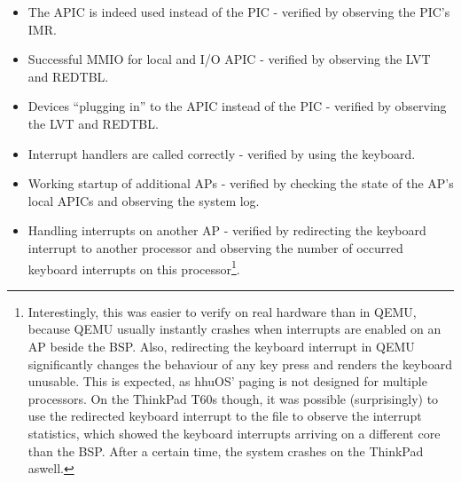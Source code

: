 \begin{itemize}
  \item The APIC is indeed used instead of the PIC - verified by observing the PIC's IMR\@.
  \item Successful MMIO for local and I/O APIC - verified by observing the LVT and REDTBL\@.
  \item Devices ``plugging in'' to the APIC instead of the PIC - verified by observing the LVT and
        REDTBL\@.
  \item Interrupt handlers are called correctly - verified by using the keyboard.
  \item Working startup of additional APs - verified by checking the state of the AP's local APICs and
        observing the system log.
  \item Handling interrupts on another AP - verified by redirecting the keyboard interrupt to another
        processor and observing the number of occurred keyboard interrupts on this
        processor\footnote{Interestingly, this was easier to verify on real hardware than in QEMU, because
          QEMU usually instantly crashes when interrupts are enabled on an AP beside the BSP. Also,
          redirecting the keyboard interrupt in QEMU significantly changes the behaviour of any key press and
          renders the keyboard unusable. This is expected, as hhuOS' paging is not designed for multiple
          processors. On the ThinkPad T60s though, it was possible (surprisingly) to use the redirected
          keyboard interrupt to  the  file to observe the interrupt
          statistics, which showed the keyboard interrupts arriving on a different core than the BSP. After a
          certain time, the system crashes on the ThinkPad aswell.}.
\end{itemize}
